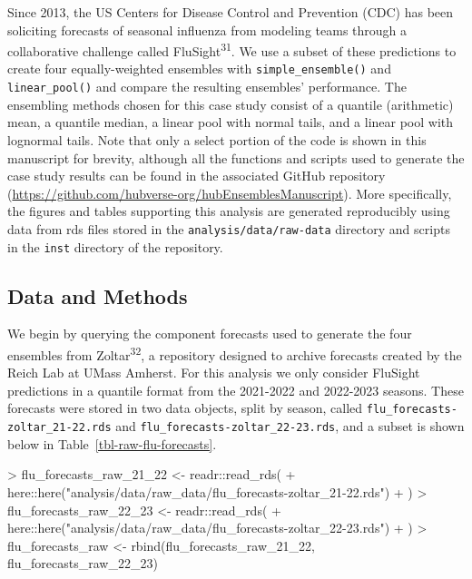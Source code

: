 \documentclass[
  letterpaper,
  DIV=11,
  numbers=noendperiod]{scrartcl}
\newenvironment{Shaded}{\begin{snugshade}}{\end{snugshade}}
\newcommand{\FunctionTok}[1]{\textcolor[rgb]{0.28,0.35,0.67}{#1}}
\newcommand{\NormalTok}[1]{\textcolor[rgb]{0.00,0.23,0.31}{#1}}
\newcommand{\OtherTok}[1]{\textcolor[rgb]{0.00,0.23,0.31}{#1}}
\newcommand{\SpecialCharTok}[1]{\textcolor[rgb]{0.37,0.37,0.37}{#1}}
\newcommand{\StringTok}[1]{\textcolor[rgb]{0.13,0.47,0.30}{#1}}
\begin{document}
Since 2013, the US Centers for Disease Control and Prevention (CDC) has
been soliciting forecasts of seasonal influenza from modeling teams
through a collaborative challenge called FluSight\textsuperscript{31}.
We use a subset of these predictions to create four equally-weighted
ensembles with \texttt{simple\_ensemble()} and \texttt{linear\_pool()}
and compare the resulting ensembles' performance. The ensembling methods
chosen for this case study consist of a quantile (arithmetic) mean, a
quantile median, a linear pool with normal tails, and a linear pool with
lognormal tails. Note that only a select portion of the code is shown in
this manuscript for brevity, although all the functions and scripts used
to generate the case study results can be found in the associated GitHub
repository
(\url{https://github.com/hubverse-org/hubEnsemblesManuscript}). More
specifically, the figures and tables supporting this analysis are
generated reproducibly using data from rds files stored in the
\texttt{analysis/data/raw-data} directory and scripts in the
\texttt{inst} directory of the repository.

\subsection{Data and Methods}\label{data-and-methods}

We begin by querying the component forecasts used to generate the four
ensembles from Zoltar\textsuperscript{32}, a repository designed to
archive forecasts created by the Reich Lab at UMass Amherst. For this
analysis we only consider FluSight predictions in a quantile format from
the 2021-2022 and 2022-2023 seasons. These forecasts were stored in two
data objects, split by season, called
\texttt{flu\_forecasts-zoltar\_21-22.rds} and
\texttt{flu\_forecasts-zoltar\_22-23.rds}, and a subset is shown below
in Table~\ref{tbl-raw-flu-forecasts}.

\begin{Shaded}
\begin{Highlighting}[]
\SpecialCharTok{\textgreater{}}\NormalTok{ flu\_forecasts\_raw\_21\_22 }\OtherTok{\textless{}{-}}\NormalTok{ readr}\SpecialCharTok{::}\FunctionTok{read\_rds}\NormalTok{(}
\SpecialCharTok{+}\NormalTok{     here}\SpecialCharTok{::}\FunctionTok{here}\NormalTok{(}\StringTok{"analysis/data/raw\_data/flu\_forecasts{-}zoltar\_21{-}22.rds"}\NormalTok{)}
\SpecialCharTok{+}\NormalTok{   )}
\SpecialCharTok{\textgreater{}}\NormalTok{ flu\_forecasts\_raw\_22\_23 }\OtherTok{\textless{}{-}}\NormalTok{ readr}\SpecialCharTok{::}\FunctionTok{read\_rds}\NormalTok{(}
\SpecialCharTok{+}\NormalTok{     here}\SpecialCharTok{::}\FunctionTok{here}\NormalTok{(}\StringTok{"analysis/data/raw\_data/flu\_forecasts{-}zoltar\_22{-}23.rds"}\NormalTok{)}
\SpecialCharTok{+}\NormalTok{   )}
\SpecialCharTok{\textgreater{}}\NormalTok{ flu\_forecasts\_raw }\OtherTok{\textless{}{-}} \FunctionTok{rbind}\NormalTok{(flu\_forecasts\_raw\_21\_22, flu\_forecasts\_raw\_22\_23)}
\end{Highlighting}
\end{Shaded}
\end{document}
